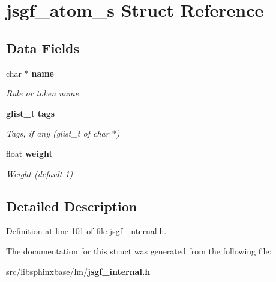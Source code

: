 \section{jsgf\-\_\-atom\-\_\-s Struct Reference}
\label{structjsgf__atom__s}
\subsection*{Data Fields}
\begin{DoxyCompactItemize}
\item 
char $\ast$ {\bf name}\label{structjsgf__atom__s_ac7473e48f49258c5e5ef65bbb669b19e}

\begin{DoxyCompactList}\small\item\em Rule or token name. \end{DoxyCompactList}\item 
{\bf glist\-\_\-t} {\bf tags}\label{structjsgf__atom__s_a4ecab128d84fd748efe52e338e7e2ecb}

\begin{DoxyCompactList}\small\item\em Tags, if any (glist\-\_\-t of char $\ast$) \end{DoxyCompactList}\item 
float {\bf weight}\label{structjsgf__atom__s_a50672ba6d1e24c55bf8b58b97114effa}

\begin{DoxyCompactList}\small\item\em Weight (default 1) \end{DoxyCompactList}\end{DoxyCompactItemize}


\subsection{Detailed Description}


Definition at line 101 of file jsgf\-\_\-internal.\-h.



The documentation for this struct was generated from the following file\-:\begin{DoxyCompactItemize}
\item 
src/libsphinxbase/lm/{\bf jsgf\-\_\-internal.\-h}\end{DoxyCompactItemize}
